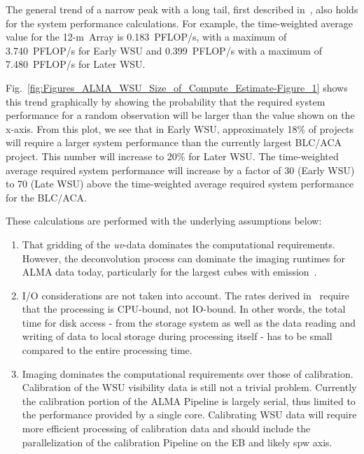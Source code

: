 The general trend of a narrow peak with a long tail, first described in~\cite{drru_mean}, also holds for the system performance calculations. For example, the time-weighted average value for the 12-m~Array is 0.183~PFLOP/s, with a maximum of 3.740~PFLOP/s for Early WSU and 0.399~PFLOP/s with a maximum of 7.480~PFLOP/s for Later WSU. 

Fig.~\ref{fig:Figures_ALMA_WSU_Size_of_Compute_Estimate-Figure_1} shows this trend graphically by showing the probability that the required system performance for a random observation will be larger than the value shown on the x-axis.
From this plot, we see that in Early WSU, approximately 18\% of projects will require a larger system performance than the currently largest BLC/ACA project. This number will increase to 20\% for Later WSU. The time-weighted average required system performance will increase by a factor of 30 (Early WSU) to 70 (Late WSU) above the time-weighted average required system performance for the BLC/ACA.

These calculations are performed with the underlying assumptions below:

\begin{enumerate}
    \item That gridding of the \textit{uv}-data dominates the computational requirements. However, the deconvolution process can dominate the imaging runtimes for ALMA data today, particularly for the largest cubes with emission~\cite{naascMemo121}.
    
    \item I/O considerations are not taken into account. The rates derived in~\cite{dpSizeOfCompute} require that the processing is CPU-bound, not IO-bound. %
    In other words, the total time for disk access - from the storage system as well as the data reading and writing of data to local storage during processing itself - has to be small compared to the entire processing time.
    
    \item Imaging dominates the computational requirements over those of calibration. Calibration of the WSU visibility data is still not a trivial problem. Currently the calibration portion of the ALMA Pipeline is largely serial, thus limited to the performance provided by a single core. Calibrating WSU data will require more efficient processing of calibration data and should include the parallelization of the calibration Pipeline on the EB and likely spw axis.
\end{enumerate}


